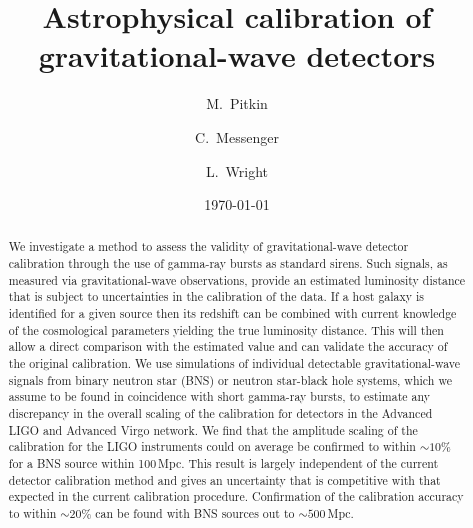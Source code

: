 \documentclass[prd, twocolumn, lengthcheck, superscriptaddress, showpacs, letterpaper, nofootinbib]{revtex4-1}
\newcommand{\dcc}{LIGO-P1500198}
\begin{document}
\title{Astrophysical calibration of gravitational-wave detectors}

\author{M.~Pitkin}
\author{C.~Messenger}
\author{L.~Wright}
  
\date{\today}

\begin{abstract}
  We investigate a method to assess the validity of gravitational-wave detector calibration 
through the use of gamma-ray bursts as standard
  sirens. Such signals, as measured via gravitational-wave
  observations, provide an estimated luminosity distance that is
  subject to uncertainties in the calibration of the data.  If a host
  galaxy is identified for a given source then its redshift can be
  combined with current knowledge of the cosmological
  parameters yielding the true luminosity distance.  This will then allow
  a direct comparison with the estimated value and can validate the accuracy of the original 
calibration. We use simulations of individual detectable gravitational-wave signals from binary 
neutron star (BNS) or neutron star-black hole systems, which we assume to be found in 
coincidence with short gamma-ray bursts, to estimate any discrepancy in the overall scaling of the 
calibration for detectors in the Advanced LIGO and Advanced Virgo network. We find that the 
amplitude scaling of the calibration for the LIGO instruments could on average be confirmed to 
within $\sim 10\%$ for a BNS source within 100\,Mpc. This result is largely independent of the 
current detector calibration method and gives an uncertainty that is competitive with that expected 
in the current calibration procedure. Confirmation of the calibration accuracy to within 
$\sim 20\%$ can be found with BNS sources out to $\sim 500$\,Mpc.
\end{abstract}

\preprint{\dcc}

\maketitle
\end{document}
